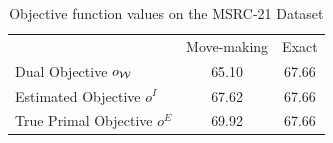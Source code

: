 \begin{table}
    \begin{center}
    \begin{tabularx}{\linewidth}{@{\extracolsep{\fill}}lcc}
    \toprule
                    & Move-making & Exact \\
    \cmidrule{1-3}
    Dual Objective $o_{\mathcal{W}}$ & 65.10 & 67.66  \\
    Estimated Objective $o^I$ &  67.62& 67.66\\
    True Primal Objective $o^E$& 69.92& 67.66\\
    \bottomrule
    \end{tabularx}
    \end{center}
    \caption{Objective function values on the MSRC-21 Dataset}
\end{table}

    
